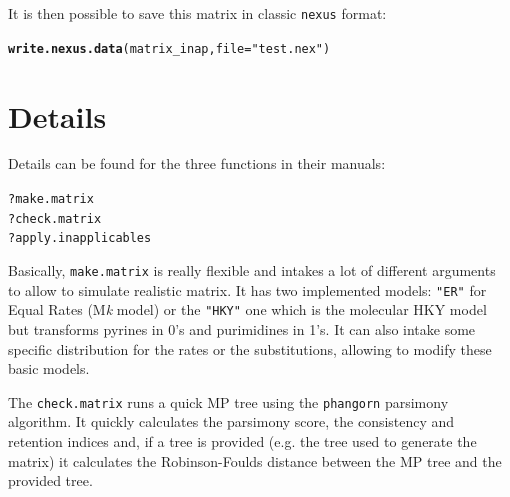 \documentclass{article}\usepackage[]{graphicx}\usepackage[]{color}
\makeatletter
\newcommand{\hlstr}[1]{\textcolor[rgb]{0.192,0.494,0.8}{#1}}%
\newcommand{\hlopt}[1]{\textcolor[rgb]{0,0,0}{#1}}%
\newcommand{\hlstd}[1]{\textcolor[rgb]{0.345,0.345,0.345}{#1}}%
\newcommand{\hlkwc}[1]{\textcolor[rgb]{0.333,0.667,0.333}{#1}}%
\newcommand{\hlkwd}[1]{\textcolor[rgb]{0.737,0.353,0.396}{\textbf{#1}}}%
\newenvironment{kframe}{%
 \def\at@end@of@kframe{}%
 \ifinner\ifhmode%
  \def\at@end@of@kframe{\end{minipage}}%
  \begin{minipage}{\columnwidth}%
 \fi\fi%
 \def\FrameCommand##1{\hskip\@totalleftmargin \hskip-\fboxsep
 \colorbox{shadecolor}{##1}\hskip-\fboxsep
     \hskip-\linewidth \hskip-\@totalleftmargin \hskip\columnwidth}%
 \MakeFramed {\advance\hsize-\width
   \@totalleftmargin\z@ \linewidth\hsize
   \@setminipage}}%
 {\par\unskip\endMakeFramed%
 \at@end@of@kframe}
\newenvironment{knitrout}{}{} %
\makeatother
\begin{document}
It is then possible to save this matrix in classic \texttt{nexus} format:

\begin{knitrout}
\color{fgcolor}\begin{kframe}
\begin{alltt}
\hlkwd{write.nexus.data}\hlstd{(matrix_inap,} \hlkwc{file} \hlstd{=} \hlstr{"test.nex"}\hlstd{)}
\end{alltt}
\end{kframe}
\end{knitrout}

\section{Details}
Details can be found for the three functions in their manuals:

\begin{knitrout}
\color{fgcolor}\begin{kframe}
\begin{alltt}
\hlopt{?}\hlstd{make.matrix}
\hlopt{?}\hlstd{check.matrix}
\hlopt{?}\hlstd{apply.inapplicables}
\end{alltt}
\end{kframe}
\end{knitrout}

Basically, \texttt{make.matrix} is really flexible and intakes a lot of different arguments to allow to simulate realistic matrix.
It has two implemented models: \texttt{"ER"} for Equal Rates (M\textit{k} model) or the \texttt{"HKY"} one which is the molecular HKY model but transforms pyrines in 0's and purimidines in 1's.
It can also intake some specific distribution for the rates or the substitutions, allowing to modify these basic models.

The \texttt{check.matrix} runs a quick MP tree using the \texttt{phangorn} parsimony algorithm.
It quickly calculates the parsimony score, the consistency and retention indices and, if a tree is provided (e.g. the tree used to generate the matrix) it calculates the Robinson-Foulds distance between the MP tree and the provided tree.
\end{document}
